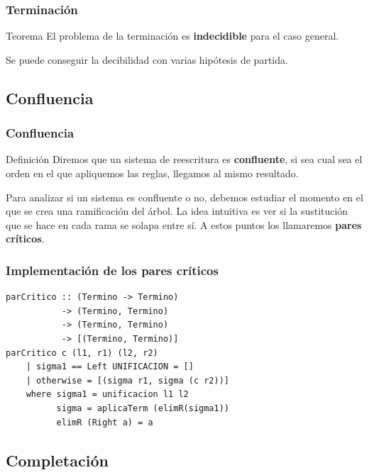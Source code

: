 \documentclass{beamer}
\begin{document}
\begin{frame}
  \frametitle{Terminación}
  \begin{block}{Teorema}
    El problema de la terminación es \textbf{indecidible} para el caso
    general.
  \end{block}

  \begin{block}{}
    Se puede conseguir la decibilidad con varias hipótesis de partida.
  \end{block}
\end{frame}

\subsection{Confluencia}
\begin{frame}
  \frametitle{Confluencia}
  \begin{block}{Definición}
    Diremos que un sistema de reescritura es \textbf{confluente}, si
    sea cual sea el orden en el que apliquemos las reglas, llegamos al
    mismo resultado.
  \end{block}

  \begin{block}{}
    Para analizar si un sistema es confluente o no, debemos estudiar el
    momento en el que se crea una ramificación del árbol. La idea
    intuitiva es ver si la sustitución que se hace en cada rama se
    solapa entre sí. A estos puntos los llamaremos \textbf{pares
    críticos}.
  \end{block}
\end{frame}

\begin{frame}[fragile]
    \frametitle{Implementación de los pares críticos}
\begin{lstlisting}[frame=single]
parCritico :: (Termino -> Termino)
           -> (Termino, Termino)
           -> (Termino, Termino)
           -> [(Termino, Termino)]
parCritico c (l1, r1) (l2, r2)
    | sigma1 == Left UNIFICACION = []
    | otherwise = [(sigma r1, sigma (c r2))]
    where sigma1 = unificacion l1 l2
          sigma = aplicaTerm (elimR(sigma1))
          elimR (Right a) = a
\end{lstlisting}
 
\end{frame}
\subsection{Completación}
\end{document}
